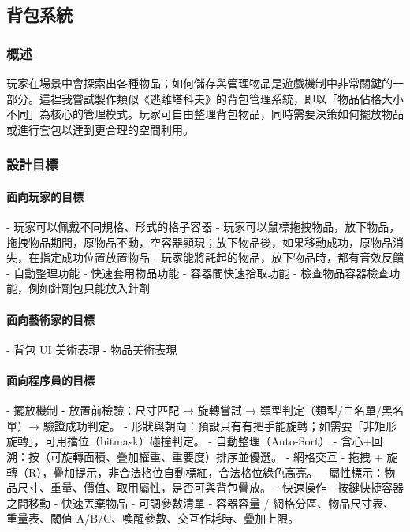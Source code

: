 \subsection{背包系統}

\subsubsection{概述}
玩家在場景中會探索出各種物品；如何儲存與管理物品是遊戲機制中非常關鍵的一部分。這裡我嘗試製作類似《逃離塔科夫》的背包管理系統，即以「物品佔格大小不同」為核心的管理模式。玩家可自由整理背包物品，同時需要決策如何擺放物品或進行套包以達到更合理的空間利用。

\subsubsection{設計目標}
\paragraph{\Large\bfseries 面向玩家的目標}
\begin{markdown}
- 玩家可以佩戴不同規格、形式的格子容器
- 玩家可以鼠標拖拽物品，放下物品，拖拽物品期間，原物品不動，空容器顯現；放下物品後，如果移動成功，原物品消失，在指定成功位置放置物品
- 玩家能將託起的物品，放下物品時，都有音效反饋
- 自動整理功能
- 快速套用物品功能
- 容器間快速拾取功能
- 檢查物品容器檢查功能，例如針劑包只能放入針劑
\end{markdown}
\paragraph{\Large\bfseries 面向藝術家的目標}
\begin{markdown}
- 背包 UI 美術表現
- 物品美術表現
\end{markdown}
\paragraph{\Large\bfseries 面向程序員的目標}
\begin{markdown}
- 擺放機制
  - 放置前檢驗：尺寸匹配 → 旋轉嘗試 → 類型判定（類型/白名單/黑名單）→ 驗證成功判定。
  - 形狀與朝向：預設只有有把手能旋轉；如需要「非矩形旋轉」，可用擋位（bitmask）碰撞判定。
- 自動整理（Auto-Sort）
  - 含心+回溯：按（可旋轉面積、疊加權重、重要度）排序並優選。
- 網格交互
  - 拖拽 + 旋轉（R），疊加提示，非合法格位自動標紅，合法格位綠色高亮。
  - 屬性標示：物品尺寸、重量、價值、取用屬性，是否可與背包疊放。
- 快速操作
  - 按鍵快捷容器之間移動
  - 快速丟棄物品
- 可調參數清單
  - 容器容量 / 網格分區、物品尺寸表、重量表、閾值 A/B/C、喚醒參數、交互作耗時、疊加上限。
\end{markdown}
